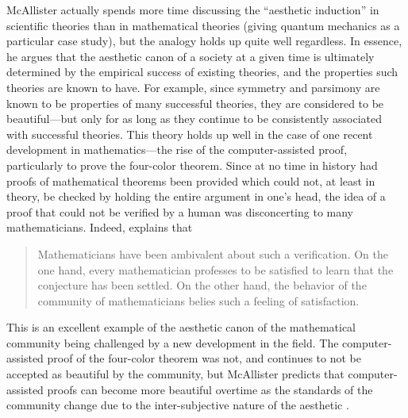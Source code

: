 \documentclass[a4paper,man,natbib]{apa6}
\begin{document}
McAllister actually spends more time discussing the ``aesthetic induction'' in scientific theories than 
in mathematical theories (giving quantum mechanics as a particular case study), but the analogy holds up quite well
regardless. In essence, he argues that the aesthetic canon of a society
at a given time is ultimately determined by the empirical success of existing theories, and the properties such
theories are known to have. For example, since symmetry and parsimony are known to be properties of many 
successful theories, they are considered to be beautiful---but only for as long as they continue to be consistently 
associated with successful theories. This theory holds up well in the case of one recent development in 
mathematics---the rise of the computer-assisted proof, particularly to prove the four-color theorem. Since at no
time in history had proofs of mathematical theorems been provided which could not, at least in theory, be checked 
by holding the entire argument in one's head, the idea of a proof that could not be verified by a human was
disconcerting to many mathematicians. Indeed, \cite{rota_phenomenology_1997} explains that
\begin{quotation}
      Mathematicians have been ambivalent about such a verification. On the one hand, every mathematician 
      professes to be satisfied to learn that the conjecture has been settled. On the other hand, the 
      behavior of the community of mathematicians belies such a feeling of satisfaction.
\end{quotation}
This is an excellent example of the aesthetic canon of the mathematical community being challenged by a new
development in the field. The computer-assisted proof of the four-color theorem was not, and continues to not be 
accepted as beautiful by the community, but McAllister predicts that computer-assisted proofs can become more 
beautiful overtime as the standards of the community change due to the inter-subjective nature of the 
aesthetic \citep{mcallister_mathematical_2005}.
\end{document}
